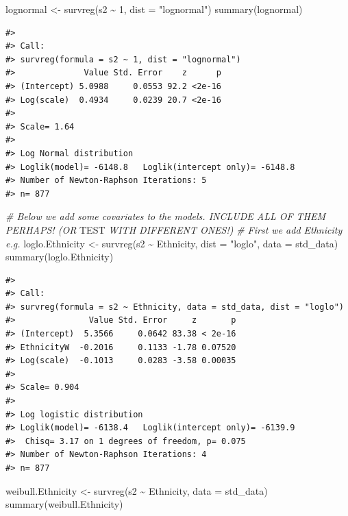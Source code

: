 \documentclass[
]{article}
\newenvironment{Shaded}{\begin{snugshade}}{\end{snugshade}}
\newcommand{\AlertTok}[1]{\textcolor[rgb]{0.94,0.16,0.16}{#1}}
\newcommand{\AttributeTok}[1]{\textcolor[rgb]{0.77,0.63,0.00}{#1}}
\newcommand{\CommentTok}[1]{\textcolor[rgb]{0.56,0.35,0.01}{\textit{#1}}}
\newcommand{\DecValTok}[1]{\textcolor[rgb]{0.00,0.00,0.81}{#1}}
\newcommand{\FunctionTok}[1]{\textcolor[rgb]{0.00,0.00,0.00}{#1}}
\newcommand{\NormalTok}[1]{#1}
\newcommand{\OtherTok}[1]{\textcolor[rgb]{0.56,0.35,0.01}{#1}}
\newcommand{\SpecialCharTok}[1]{\textcolor[rgb]{0.00,0.00,0.00}{#1}}
\newcommand{\StringTok}[1]{\textcolor[rgb]{0.31,0.60,0.02}{#1}}
\begin{document}
\begin{Shaded}
\begin{Highlighting}[]
\NormalTok{lognormal }\OtherTok{\textless{}{-}} \FunctionTok{survreg}\NormalTok{(s2 }\SpecialCharTok{\textasciitilde{}} \DecValTok{1}\NormalTok{, }\AttributeTok{dist =} \StringTok{"lognormal"}\NormalTok{)}
\FunctionTok{summary}\NormalTok{(lognormal)}
\end{Highlighting}
\end{Shaded}

\begin{verbatim}
#> 
#> Call:
#> survreg(formula = s2 ~ 1, dist = "lognormal")
#>              Value Std. Error    z      p
#> (Intercept) 5.0988     0.0553 92.2 <2e-16
#> Log(scale)  0.4934     0.0239 20.7 <2e-16
#> 
#> Scale= 1.64 
#> 
#> Log Normal distribution
#> Loglik(model)= -6148.8   Loglik(intercept only)= -6148.8
#> Number of Newton-Raphson Iterations: 5 
#> n= 877
\end{verbatim}

\begin{Shaded}
\begin{Highlighting}[]
\CommentTok{\# Below we add some covariates to the models. INCLUDE ALL OF THEM PERHAPS! (OR }\AlertTok{TEST}\CommentTok{ WITH DIFFERENT ONES!)}
\CommentTok{\# First we add Ethnicity  e.g.}
\NormalTok{loglo.Ethnicity }\OtherTok{\textless{}{-}} \FunctionTok{survreg}\NormalTok{(s2 }\SpecialCharTok{\textasciitilde{}}\NormalTok{ Ethnicity, }\AttributeTok{dist =} \StringTok{"loglo"}\NormalTok{, }\AttributeTok{data =}\NormalTok{ std\_data)  }
\FunctionTok{summary}\NormalTok{(loglo.Ethnicity)}
\end{Highlighting}
\end{Shaded}

\begin{verbatim}
#> 
#> Call:
#> survreg(formula = s2 ~ Ethnicity, data = std_data, dist = "loglo")
#>               Value Std. Error     z       p
#> (Intercept)  5.3566     0.0642 83.38 < 2e-16
#> EthnicityW  -0.2016     0.1133 -1.78 0.07520
#> Log(scale)  -0.1013     0.0283 -3.58 0.00035
#> 
#> Scale= 0.904 
#> 
#> Log logistic distribution
#> Loglik(model)= -6138.4   Loglik(intercept only)= -6139.9
#>  Chisq= 3.17 on 1 degrees of freedom, p= 0.075 
#> Number of Newton-Raphson Iterations: 4 
#> n= 877
\end{verbatim}

\begin{Shaded}
\begin{Highlighting}[]
\NormalTok{weibull.Ethnicity }\OtherTok{\textless{}{-}} \FunctionTok{survreg}\NormalTok{(s2 }\SpecialCharTok{\textasciitilde{}}\NormalTok{ Ethnicity, }\AttributeTok{data =}\NormalTok{ std\_data)}
\FunctionTok{summary}\NormalTok{(weibull.Ethnicity)}
\end{Highlighting}
\end{Shaded}
\end{document}
